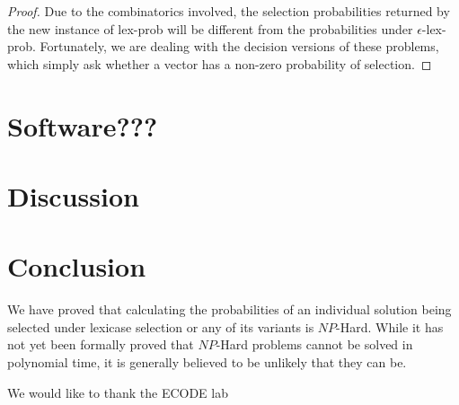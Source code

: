 \documentclass[sigconf]{acmart}
\begin{document}
\begin{proof}


Due to the combinatorics involved, the selection probabilities returned by the new instance of {\sc lex-prob} will be different from the probabilities under {\sc $\epsilon$-lex-prob}. Fortunately, we are dealing with the decision versions of these problems, which simply ask whether a vector has a non-zero probability of selection.

\end{proof}


\section{Software???}



\section{Discussion}



\section{Conclusion}

We have proved that calculating the probabilities of an individual solution being selected under lexicase selection or any of its variants is $NP$-Hard. While it has not yet been formally proved that $NP$-Hard problems cannot be solved in polynomial time, it is generally believed to be unlikely that they can be.  

\begin{acks}
We would like to thank the ECODE lab
\end{acks}
\end{document}
